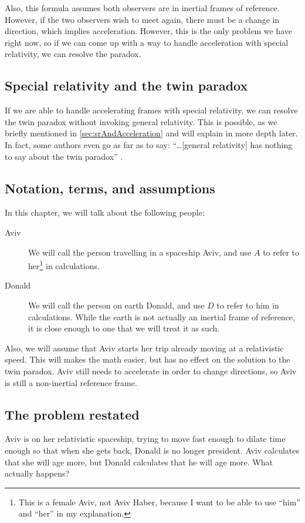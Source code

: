 		Also, this formula assumes both observers are in inertial frames of reference.
		However, if the two observers wish to meet again, there must be a change in direction, which implies acceleration.
		However, this is the only problem we have right now, so if we can come up with a way to handle acceleration with special relativity, we can resolve the paradox.
		\subsection{Special relativity and the twin paradox}
			If we are able to handle accelerating frames with special relativity, we can resolve the twin paradox without invoking general relativity.
			This is possible, as we briefly mentioned in \ref{sec:srAndAcceleration} and will explain in more depth later. In fact, some authors even go as far as to say: ``\dots [general relativity] has nothing to say about the twin paradox'' \autocite{twinparadox}.
		\subsection{Notation, terms, and assumptions}
			In this chapter, we will talk about the following people:
			\begin{description}
				\item[Aviv] We will call the person travelling in a spaceship Aviv, and use $A$ to refer to her\footnote{This is a female Aviv, not Aviv Haber, because I want to be able to use ``him'' and ``her'' in my explanation.} in calculations.

				\item[Donald]We will call the person on earth Donald, and use $D$ to refer to him in calculations. While the earth is not actually an inertial frame of reference, it is close enough to one that we will treat it as such.
			\end{description}
			Also, we will assume that Aviv starts her trip already moving at a relativistic speed.
			This will makes the math easier, but has no effect on the solution to the twin paradox.
			Aviv still needs to accelerate in order to change directions, so Aviv is still a non-inertial reference frame.
			\subsection{The problem restated}
				Aviv is on her relativistic spaceship, trying to move fast enough to dilate time enough so that when she gets back, Donald is no longer president.
				Aviv calculates that she will age more, but Donald calculates that he will age more.
				What actually happens?
